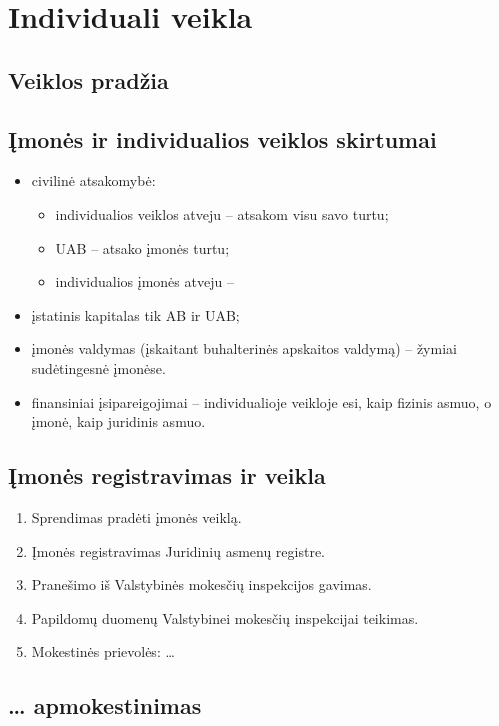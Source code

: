 \chapter{Individuali veikla}

\section{Veiklos pradžia}

\section{Įmonės ir individualios veiklos skirtumai}

\begin{itemize}
  \item civilinė atsakomybė:
    \begin{itemize}
      \item individualios veiklos atveju – atsakom visu savo turtu;
      \item UAB – atsako įmonės turtu;
      \item individualios įmonės atveju – 
    \end{itemize}
  \item įstatinis kapitalas tik AB ir UAB;
  \item įmonės valdymas (įskaitant buhalterinės apskaitos valdymą) –
    žymiai sudėtingesnė įmonėse.
  \item finansiniai įsipareigojimai – individualioje veikloje esi,
    kaip fizinis asmuo, o įmonė, kaip juridinis asmuo.
\end{itemize}

\section{Įmonės registravimas ir veikla}

\begin{enumerate}
  \item Sprendimas pradėti įmonės veiklą.
  \item Įmonės registravimas Juridinių asmenų registre.
  \item Pranešimo iš Valstybinės mokesčių inspekcijos gavimas.
  \item Papildomų duomenų Valstybinei mokesčių inspekcijai teikimas.
  \item Mokestinės prievolės: …
\end{enumerate}

\section{… apmokestinimas}

